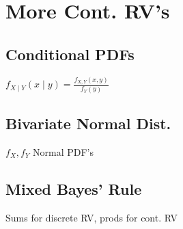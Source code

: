 \section{More Cont. RV's}

	\subsection*{Conditional PDFs}
	$f_{X\mid Y}\left(x\mid y\right) = \frac{f_{X,Y}\left(x, y\right)}{f_{Y}\left(y\right)}$
	
	\subsection*{Bivariate Normal Dist.}
	$f_{X}, f_{Y}$ Normal PDF's
	
	\subsection*{Mixed Bayes' Rule}
	Sums for discrete RV, prods for cont. RV
	